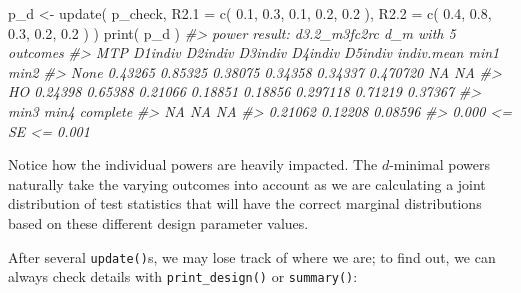 \documentclass{article}
\newenvironment{Shaded}{\begin{snugshade}}{\end{snugshade}}
\newcommand{\AttributeTok}[1]{\textcolor[rgb]{0.77,0.63,0.00}{#1}}
\newcommand{\CommentTok}[1]{\textcolor[rgb]{0.56,0.35,0.01}{\textit{#1}}}
\newcommand{\FloatTok}[1]{\textcolor[rgb]{0.00,0.00,0.81}{#1}}
\newcommand{\FunctionTok}[1]{\textcolor[rgb]{0.00,0.00,0.00}{#1}}
\newcommand{\NormalTok}[1]{#1}
\newcommand{\OtherTok}[1]{\textcolor[rgb]{0.56,0.35,0.01}{#1}}
\begin{document}
\begin{Shaded}
\begin{Highlighting}[]
\NormalTok{p\_d }\OtherTok{\textless{}{-}} \FunctionTok{update}\NormalTok{( p\_check,}
               \AttributeTok{R2.1 =} \FunctionTok{c}\NormalTok{( }\FloatTok{0.1}\NormalTok{, }\FloatTok{0.3}\NormalTok{, }\FloatTok{0.1}\NormalTok{, }\FloatTok{0.2}\NormalTok{, }\FloatTok{0.2}\NormalTok{ ),}
               \AttributeTok{R2.2 =} \FunctionTok{c}\NormalTok{( }\FloatTok{0.4}\NormalTok{, }\FloatTok{0.8}\NormalTok{, }\FloatTok{0.3}\NormalTok{, }\FloatTok{0.2}\NormalTok{, }\FloatTok{0.2}\NormalTok{ ) )}
\FunctionTok{print}\NormalTok{( p\_d )}
\CommentTok{\#\textgreater{} power result: d3.2\_m3fc2rc d\_m with 5 outcomes}
\CommentTok{\#\textgreater{}   MTP D1indiv D2indiv D3indiv D4indiv D5indiv indiv.mean    min1    min2}
\CommentTok{\#\textgreater{}  None 0.43265 0.85325 0.38075 0.34358 0.34337   0.470720      NA      NA}
\CommentTok{\#\textgreater{}    HO 0.24398 0.65388 0.21066 0.18851 0.18856   0.297118 0.71219 0.37367}
\CommentTok{\#\textgreater{}     min3    min4 complete}
\CommentTok{\#\textgreater{}       NA      NA       NA}
\CommentTok{\#\textgreater{}  0.21062 0.12208  0.08596}
\CommentTok{\#\textgreater{}  0.000 \textless{}= SE \textless{}= 0.001}
\end{Highlighting}
\end{Shaded}

Notice how the individual powers are heavily impacted. The \(d\)-minimal
powers naturally take the varying outcomes into account as we are
calculating a joint distribution of test statistics that will have the
correct marginal distributions based on these different design parameter
values.

After several \texttt{update()}s, we may lose track of where we are; to
find out, we can always check details with \texttt{print\_design()} or
\texttt{summary()}:
\end{document}
